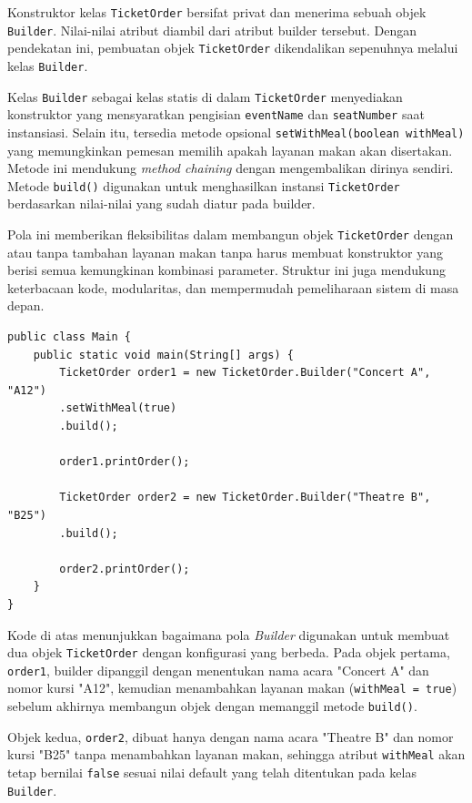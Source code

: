 Konstruktor kelas \texttt{TicketOrder} bersifat privat dan menerima sebuah objek \texttt{Builder}. Nilai-nilai atribut diambil dari atribut builder tersebut. Dengan pendekatan ini, pembuatan objek \texttt{TicketOrder} dikendalikan sepenuhnya melalui kelas \texttt{Builder}.

Kelas \texttt{Builder} sebagai kelas statis di dalam \texttt{TicketOrder} menyediakan konstruktor yang mensyaratkan pengisian \texttt{eventName} dan \texttt{seatNumber} saat instansiasi. Selain itu, tersedia metode opsional \texttt{setWithMeal(boolean withMeal)} yang memungkinkan pemesan memilih apakah layanan makan akan disertakan. Metode ini mendukung \textit{method chaining} dengan mengembalikan dirinya sendiri. Metode \texttt{build()} digunakan untuk menghasilkan instansi \texttt{TicketOrder} berdasarkan nilai-nilai yang sudah diatur pada builder.

Pola ini memberikan fleksibilitas dalam membangun objek \texttt{TicketOrder} dengan atau tanpa tambahan layanan makan tanpa harus membuat konstruktor yang berisi semua kemungkinan kombinasi parameter. Struktur ini juga mendukung keterbacaan kode, modularitas, dan mempermudah pemeliharaan sistem di masa depan.

\begin{lstlisting}[style=JavaStyle, caption={Penggunaan Builder untuk Membuat Pesanan Tiket}, label={lst:builder-ticket-main}]
public class Main {
	public static void main(String[] args) {
		TicketOrder order1 = new TicketOrder.Builder("Concert A", "A12")
		.setWithMeal(true)
		.build();
		
		order1.printOrder();
		
		TicketOrder order2 = new TicketOrder.Builder("Theatre B", "B25")
		.build();
		
		order2.printOrder();
	}
}
\end{lstlisting}

Kode di atas menunjukkan bagaimana pola \textit{Builder} digunakan untuk membuat dua objek \texttt{TicketOrder} dengan konfigurasi yang berbeda. Pada objek pertama, \texttt{order1}, builder dipanggil dengan menentukan nama acara "Concert A" dan nomor kursi "A12", kemudian menambahkan layanan makan (\texttt{withMeal = true}) sebelum akhirnya membangun objek dengan memanggil metode \texttt{build()}.

Objek kedua, \texttt{order2}, dibuat hanya dengan nama acara "Theatre B" dan nomor kursi "B25" tanpa menambahkan layanan makan, sehingga atribut \texttt{withMeal} akan tetap bernilai \texttt{false} sesuai nilai default yang telah ditentukan pada kelas \texttt{Builder}.

